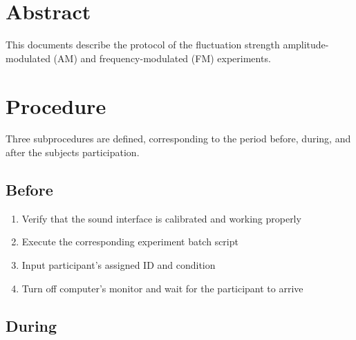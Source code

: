 \documentclass[a4paper]{article}
\begin{document}

\section{Abstract} %
\label{sec:abstract}

This documents describe the protocol of the fluctuation strength
amplitude-modulated (AM) and frequency-modulated (FM) experiments.


\section{Procedure} %
\label{sec:procedure}

Three subprocedures are defined, corresponding to the period before, during, and
after the subjects participation.

\subsection{Before} %
\label{sub:before}

\begin{enumerate}
  \item Verify that the sound interface is calibrated and working properly
  \item Execute the corresponding experiment batch script\footnotemark[1]
  \item Input participant's assigned ID and condition\footnotemark[2]
  \item Turn off computer's monitor and wait for the participant to arrive
\end{enumerate}



\subsection{During} %
\label{sub:during}
\end{document}
